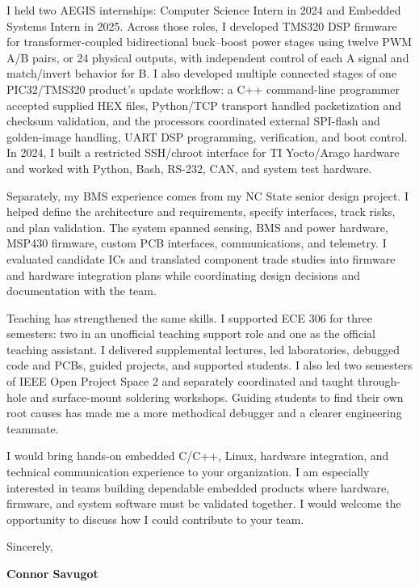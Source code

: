 \documentclass[10pt,letterpaper]{article}
\newcommand{\TargetCompany}{your organization}
\newcommand{\InterestSentence}{I am especially interested in teams building dependable embedded products where hardware, firmware, and system software must be validated together.}
\begin{document}
I held two AEGIS internships: Computer Science Intern in 2024 and Embedded Systems Intern in 2025. Across those roles, I developed TMS320 DSP firmware for transformer-coupled bidirectional buck--boost power stages using twelve PWM A/B pairs, or 24 physical outputs, with independent control of each A signal and match/invert behavior for B. I also developed multiple connected stages of one PIC32/TMS320 product's update workflow: a C++ command-line programmer accepted supplied HEX files, Python/TCP transport handled packetization and checksum validation, and the processors coordinated external SPI-flash and golden-image handling, UART DSP programming, verification, and boot control. In 2024, I built a restricted SSH/chroot interface for TI Yocto/Arago hardware and worked with Python, Bash, RS-232, CAN, and system test hardware.

Separately, my BMS experience comes from my NC State senior design project. I helped define the architecture and requirements, specify interfaces, track risks, and plan validation. The system spanned sensing, BMS and power hardware, MSP430 firmware, custom PCB interfaces, communications, and telemetry. I evaluated candidate ICs and translated component trade studies into firmware and hardware integration plans while coordinating design decisions and documentation with the team.

Teaching has strengthened the same skills. I supported ECE 306 for three semesters: two in an unofficial teaching support role and one as the official teaching assistant. I delivered supplemental lectures, led laboratories, debugged code and PCBs, guided projects, and supported students. I also led two semesters of IEEE Open Project Space 2 and separately coordinated and taught through-hole and surface-mount soldering workshops. Guiding students to find their own root causes has made me a more methodical debugger and a clearer engineering teammate.

I would bring hands-on embedded C/C++, Linux, hardware integration, and technical communication experience to \TargetCompany. \InterestSentence{} I would welcome the opportunity to discuss how I could contribute to your team.

Sincerely,

\textbf{Connor Savugot}
\end{document}
